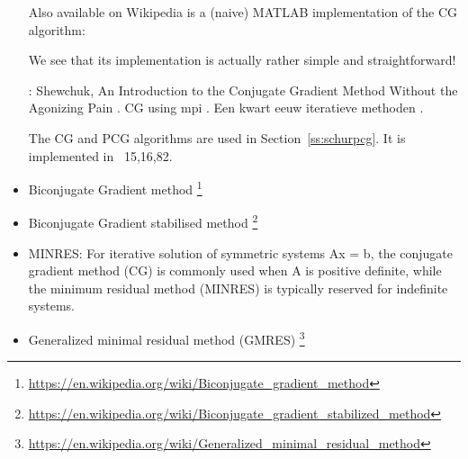 \begin{itemize}
Also available on Wikipedia is a (naive) MATLAB implementation of the CG algorithm:
\begin{center}
\end{center}
We see that its implementation is actually rather simple and straightforward!

\Literature: Shewchuk, An Introduction to the Conjugate 
Gradient Method Without the Agonizing Pain \cite{shew94}.
CG using mpi \cite{siho04}.
Een kwart eeuw iteratieve methoden \cite{vuik09}.

The CG and PCG algorithms are used in Section~\ref{ss:schurpcg}.
It is implemented in \stone~15,16,82.

\item Biconjugate Gradient method
\footnote{\url{https://en.wikipedia.org/wiki/Biconjugate_gradient_method}}
\item Biconjugate Gradient stabilised method
\footnote{\url{https://en.wikipedia.org/wiki/Biconjugate_gradient_stabilized_method}}
\item MINRES: For iterative solution of symmetric systems Ax = b, the conjugate gradient method
(CG) is commonly used when A is positive definite, while the minimum residual method (MINRES)
is typically reserved for indefinite systems.
\item Generalized minimal residual method (GMRES)
\footnote{\url{https://en.wikipedia.org/wiki/Generalized_minimal_residual_method}}
\end{itemize}





